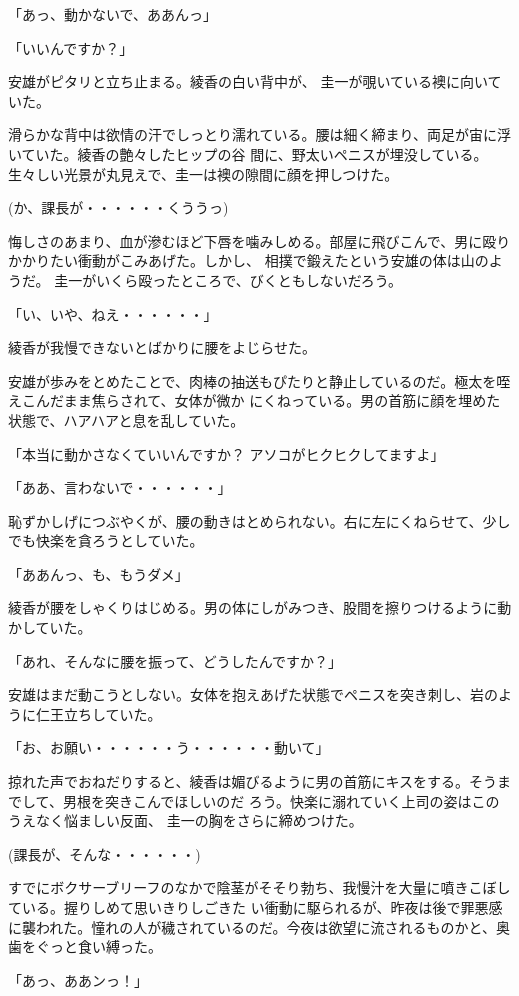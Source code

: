 ﻿\documentclass[book,tate]{jlreq}
\begin{document}
「あっ、動かないで、ああんっ」

「いいんですか？」

安雄がピタリと立ち止まる。綾香の白い背中が、 圭一が覗いている襖に向いていた。

滑らかな背中は欲情の汗でしっとり濡れている。腰は細く締まり、両足が宙に浮いていた。綾香の艶々したヒップの谷 間に、野太いペニスが埋没している。生々しい光景が丸見えで、圭一は襖の隙間に顔を押しつけた。

(か、課長が・・・・・・くううっ)

悔しさのあまり、血が滲むほど下唇を噛みしめる。部屋に飛びこんで、男に殴りかかりたい衝動がこみあげた。しかし、 相撲で鍛えたという安雄の体は山のようだ。 圭一がいくら殴ったところで、びくともしないだろう。

「い、いや、ねえ・・・・・・」

綾香が我慢できないとばかりに腰をよじらせた。

安雄が歩みをとめたことで、肉棒の抽送もぴたりと静止しているのだ。極太を咥えこんだまま焦らされて、女体が微か にくねっている。男の首筋に顔を埋めた状態で、ハアハアと息を乱していた。

「本当に動かさなくていいんですか？ アソコがヒクヒクしてますよ」

「ああ、言わないで・・・・・・」

恥ずかしげにつぶやくが、腰の動きはとめられない。右に左にくねらせて、少しでも快楽を貪ろうとしていた。

「ああんっ、も、もうダメ」

綾香が腰をしゃくりはじめる。男の体にしがみつき、股間を擦りつけるように動かしていた。

「あれ、そんなに腰を振って、どうしたんですか？」

安雄はまだ動こうとしない。女体を抱えあげた状態でペニスを突き刺し、岩のように仁王立ちしていた。

「お、お願い・・・・・・う・・・・・・動いて」

掠れた声でおねだりすると、綾香は媚びるように男の首筋にキスをする。そうまでして、男根を突きこんでほしいのだ ろう。快楽に溺れていく上司の姿はこのうえなく悩ましい反面、 圭一の胸をさらに締めつけた。

(課長が、そんな・・・・・・)

すでにボクサーブリーフのなかで陰茎がそそり勃ち、我慢汁を大量に噴きこぼしている。握りしめて思いきりしごきた い衝動に駆られるが、昨夜は後で罪悪感に襲われた。憧れの人が穢されているのだ。今夜は欲望に流されるものかと、奥歯をぐっと食い縛った。

「あっ、ああンっ！」
\end{document}
